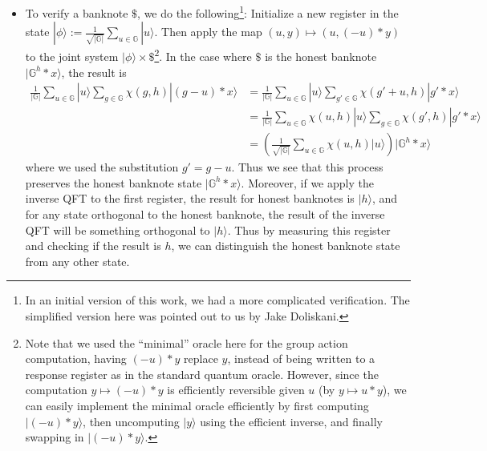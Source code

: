 \documentclass{article}\usepackage[a4paper,margin=20mm]{geometry}
\numberwithin{theorem}{section}
\numberwithin{equation}{section}
\newcommand{\G}{\mathbb{G}}
\begin{document}
\begin{itemize}
	Now measure $h$, in which case the second register collapses to $|\G^h*x\rangle$. Output $h$ as the serial number, and $|\G^h*x\rangle$ as the money state.
	\item To verify a banknote $\$$, we do the following\footnote{In an initial version of this work, we had a more complicated verification. The simplified version here was pointed out to us by Jake Doliskani.}: Initialize a new register in the state $|\phi\rangle:=\frac{1}{\sqrt{|\G|}}\sum_{u\in\G}|u\rangle$. Then apply the map $(u,y)\mapsto(u,(-u)*y)$ to the joint system $|\phi\rangle\times \$$\enspace\footnote{Note that we used the ``minimal'' oracle here for the group action computation, having $(-u)*y$ replace $y$, instead of being written to a response register as in the standard quantum oracle. However, since the computation $y\mapsto (-u)*y$ is efficiently reversible given $u$ (by $y\mapsto u*y$), we can easily implement the minimal oracle efficiently by first computing $|(-u)*y\rangle$, then uncomputing $|y\rangle$ using the efficient inverse, and finally swapping in $|(-u)*y\rangle$.}. In the case where $\$$ is the honest banknote $|\G^h*x\rangle$, the result is
	\begin{align*}\frac{1}{|\G|}\sum_{u\in\G}|u\rangle \sum_{g\in\G}\chi(g,h)|(g-u)*x\rangle&=\frac{1}{|\G|}\sum_{u\in\G}|u\rangle \sum_{g'\in\G}\chi(g'+u,h)|g'*x\rangle\\&=\frac{1}{|\G|}\sum_{u\in\G}\chi(u,h)|u\rangle\sum_{g\in\G}\chi(g',h)|g'*x\rangle\\
		&=\left(\frac{1}{\sqrt{|\G|}}\sum_{u\in\G}\chi(u,h)|u\rangle\right)|\G^h*x\rangle\end{align*}
	where we used the substitution $g'=g-u$. Thus we see that this process preserves the honest banknote state $|\G^h*x\rangle$. Moreover, if we apply the inverse QFT to the first register, the result for honest banknotes is $|h\rangle$, and for any state orthogonal to the honest banknote, the result of the inverse QFT will be something orthogonal to $|h\rangle$. Thus by measuring this register and checking if the result is $h$, we can distinguish the honest banknote state from any other state.
\end{itemize}
\end{document}
